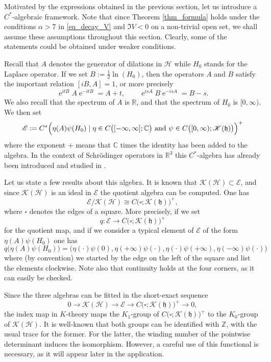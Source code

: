 \documentclass{article}
\def\C{\mathbb C}
\def\H{\mathcal H}
\def\K{\mathscr K}
\def\R{\mathbb R}
\def\HS{\mathfrak h}
\def\EE{\mathscr E}
\def\Z{\mathbb Z}
\def\e{\mathop{\mathrm{e}}\nolimits}
\begin{document}
Motivated by the expressions obtained in the previous section, let us introduce
a $C^*$-algebraic framework.
Note that since Theorem \ref{thm_formula} holds under the conditions $\alpha > 7 $ in \eqref{eq_decay_V} and $\Im V<0$ on a non-trivial open set, we shall assume these assumptions throughout this section. Clearly, some of the statements could be obtained under weaker conditions.

Recall that $A$ denotes the generator of dilations in $\H$ while $H_0$ stands for the Laplace
operator. If we set $B:=\frac{1}{2}\ln(H_0)$, then the operators $A$ and $B$ satisfy the important relation $[iB,A]=1$, or more precisely
$$
\e^{itB}A\e^{-itB}=A+t, \qquad \e^{isA}B\e^{-isA}=B-s.
$$
We also recall that the spectrum of $A$ is $\R$, and that the spectrum of $H_0$ is $[0,\infty)$.
We then set
$$
\EE:=C^*\Big(\eta(A)\psi(H_0)\mid \eta\in C\big([-\infty, \infty];\C\big) \hbox{ and } 
\psi\in C\big([0,\infty);\K(\HS)\big)\Big)^+
$$
where the exponent $+$ means that $\C$ times the identity has been added to the algebra.
In the context of Schr\"o\-dinger operators in $\R^3$ this $C^*$-algebra has already been introduced 
and studied in \cite[Sec.~4]{KR12}.

Let us state a few results about this algebra. It is known that $\K(\H)\subset \EE$, and
since $\K(\H)$ is an ideal in $\EE$ the quotient algebra can be computed. One has
$$
\EE/\K(\H) \cong C\big(\square; \K(\HS)\big)^+,
$$
where $\square$ denotes the edges of a square. More precisely, if we set 
$$
q:\EE \to  C\big(\square; \K(\HS)\big)^+
$$
for the quotient map, and if we consider a typical element of $\EE$ of the form $\eta(A)\psi(H_0)$
one has 
$$
q\big(\eta(A)\psi(H_0)\big) = \Big(\eta(\cdot)\psi(0), \eta(+\infty)\psi(\cdot), \eta(\cdot)\psi(+\infty), \eta(-\infty)\psi(\cdot)\Big)
$$
where (by convention) we started by the edge on the left of the square and list  the elements clockwise.
Note also that continuity holds at the four corners, as it can easily be checked.

Since the three algebras can be fitted in the short-exact sequence
$$
0 \to \K(\H)\to \EE\to C\big(\square; \K(\HS)\big)^+ \to 0,
$$
the index map in $K$-theory maps the $K_1$-group of $C\big(\square; \K(\HS)\big)^+$
to the $K_0$-group of $\K(\H)$. 
It is well-known that both groups can be identified with $\Z$, with the usual trace for the former.
For the latter, the winding number of the pointwise determinant induces the isomorphism.
However, a careful use of this functional is necessary, as it will appear later in the application.
  
\end{document}
